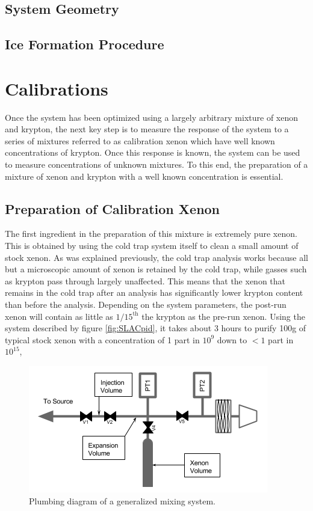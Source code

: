 \documentclass[12pt]{article}
\begin{document}
\subsection{System Geometry}
\label{sec:geometry}

\subsection{Ice Formation Procedure}

\section{Calibrations}
Once the system has been optimized using a largely arbitrary mixture of xenon and krypton, the next key step is to measure the response of the system to a series of mixtures referred to as calibration xenon which have well known concentrations of krypton. Once this response is known, the system can be used to measure concentrations of unknown mixtures. To this end, the preparation of a mixture of xenon and krypton with a well known concentration is essential.

\subsection{Preparation of Calibration Xenon}
The first ingredient in the preparation of this mixture is extremely pure xenon. This is obtained by using the cold trap system itself to clean a small amount of stock xenon. As was explained previously, the cold trap analysis works because all but a microscopic amount of xenon is retained by the cold trap, while gasses such as krypton pass through largely unaffected. This means that the xenon that remains in the cold trap after an analysis has significantly lower krypton content than before the analysis. Depending on the system parameters, the post-run xenon will contain as little as $1/15^{\textrm{th}}$ the krypton as the pre-run xenon. Using the system described by figure \ref{fig:SLACpid}, it takes about 3 hours to purify 100g of typical stock xenon with a concentration of 1 part in $10^{9}$ down to $< 1$ part in $10^{15}$, 


\begin{figure}[h]
  \includegraphics[width=\linewidth]{Figures/Mixing_diagram.png}
  \caption{Plumbing diagram of a generalized mixing system. }
  \label{fig:mixpid}
\end{figure}
\end{document}
